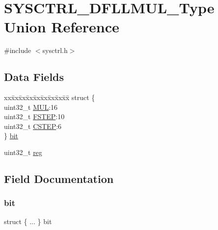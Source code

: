 \hypertarget{union_s_y_s_c_t_r_l___d_f_l_l_m_u_l___type}{}\section{S\+Y\+S\+C\+T\+R\+L\+\_\+\+D\+F\+L\+L\+M\+U\+L\+\_\+\+Type Union Reference}
\label{union_s_y_s_c_t_r_l___d_f_l_l_m_u_l___type}


{\ttfamily \#include $<$sysctrl.\+h$>$}

\subsection*{Data Fields}
\begin{DoxyCompactItemize}
\item 
\begin{tabbing}
xx\=xx\=xx\=xx\=xx\=xx\=xx\=xx\=xx\=\kill
struct \{\\
\>uint32\_t \mbox{\hyperlink{union_s_y_s_c_t_r_l___d_f_l_l_m_u_l___type_a225867261ccf5587a77b6a121044e6b1}{MUL}}:16\\
\>uint32\_t \mbox{\hyperlink{union_s_y_s_c_t_r_l___d_f_l_l_m_u_l___type_a98da5e6ead5cef04e2152e73143efff7}{FSTEP}}:10\\
\>uint32\_t \mbox{\hyperlink{union_s_y_s_c_t_r_l___d_f_l_l_m_u_l___type_a0055254231562e8bcf3398b805ffe2d7}{CSTEP}}:6\\
\} \mbox{\hyperlink{union_s_y_s_c_t_r_l___d_f_l_l_m_u_l___type_a03027284529a00ddb1646c94e2fa0d79}{bit}}\\

\end{tabbing}\item 
uint32\+\_\+t \mbox{\hyperlink{union_s_y_s_c_t_r_l___d_f_l_l_m_u_l___type_a6b91636401516a477989a336376d7b40}{reg}}
\end{DoxyCompactItemize}


\subsection{Field Documentation}
\mbox{\label{union_s_y_s_c_t_r_l___d_f_l_l_m_u_l___type_a03027284529a00ddb1646c94e2fa0d79}} 
\subsubsection{\texorpdfstring{bit}{bit}}
{\footnotesize\ttfamily struct \{ ... \}   bit}

